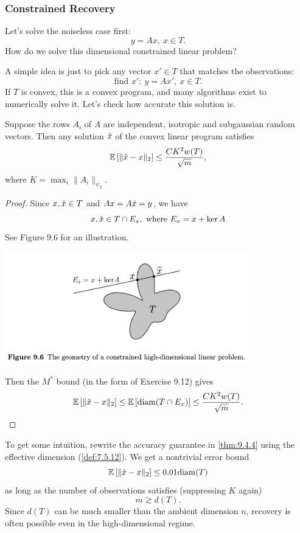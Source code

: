 \subsubsection{Constrained Recovery}
Let's solve the noiseless case first:
\[ y = Ax, \ x \in T. \]
How do we solve this dimensional constrained linear problem?

A simple idea is just to pick any vector $x' \in T$ that matches the observations:
\[ \text{find } x': \ y = Ax', \ x \in T. \]
If $T$ is convex, this is a convex program, and many algorithms exist to numerically solve it. Let's check 
how accurate this solution is.

\begin{theorem}
\label{thm:9.4.4}
Suppose the rows $A_i$ of $A$ are independent, isotropic and subgaussian random vectors. Then any solution 
$\Hat{x}$ of the convex linear program satisfies 
\[ \mathbb{E}\left[ \lVert \Hat{x} - x \rVert_{2} \right] \leq \frac{CK^2 w(T)}{\sqrt{m}}, \]
where $K = \max_{i}\lVert A_i \rVert_{\psi_2}$.
\end{theorem}

\begin{proof}
Since $x, \Hat{x} \in T$ and $Ax = A \Hat{x} = y$, we have 
\[ x, \Hat{x} \in T \cap E_x, \text{ where } E_x = x + \ker{A} \]
See Figure 9.6 for an illustration.

\begin{center}
    \includegraphics[width=0.8\textwidth]{Chapter 9/fig9-6.png}
\end{center}
Then the $M^*$ bound (in the form of Exercise 9.12) gives 
\[ \mathbb{E}\left[ \lVert \Hat{x} - x \rVert_{2} \right] 
\leq \mathbb{E}\left[ \mathrm{diam}(T \cap E_x) \right] \leq \frac{CK^2 w(T)}{\sqrt{m}}. \]
\end{proof}

\begin{remark}
\label{rmk:9.4.5}
To get some intuition, rewrite the accuracy guarantee in \cref{thm:9.4.4} using the effective dimension 
(\cref{def:7.5.12}). We get a nontrivial error bound 
\[ \mathbb{E}\left[ \lVert \Hat{x} - x \rVert_{2} \right] \leq 0.01 \mathrm{diam}(T) \]
as long as the number of observations satisfies (suppressing $K$ again)
\[ m \gtrsim d(T). \]
Since $d(T)$ can be much smaller than the ambient dimension $n$, recovery is often possible even in the 
high-dimensional regime.
\end{remark}


